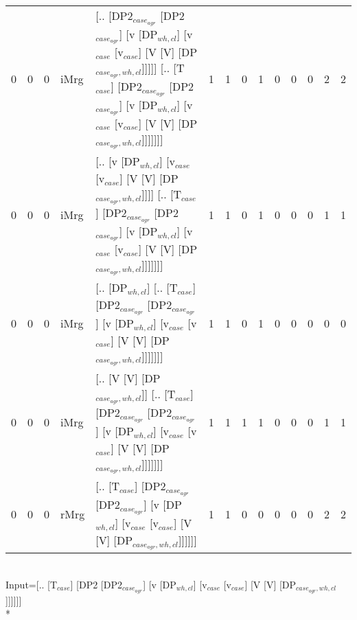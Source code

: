 \begin{tabularx}{\linewidth}{rrrlXrrrrrrrrr}
   0 &       0 &   0 & iMrg & [.. [DP2$_{case_{agr}}$ [DP2$_{case_{agr}}$] [v [DP$_{wh,cl}$] [v$_{case}$ [v$_{case}$] [V [V] [DP$_{case_{agr},wh,cl}$]]]]] [.. [T$_{case}$] [DP2$_{case_{agr}}$ [DP2$_{case_{agr}}$] [v [DP$_{wh,cl}$] [v$_{case}$ [v$_{case}$] [V [V] [DP$_{case_{agr},wh,cl}$]]]]]]] &             1 &             1 &                  0 &            1 &              0 &            0 &              0 &        2 &        2 \\
   0 &       0 &   0 & iMrg & [.. [v [DP$_{wh,cl}$] [v$_{case}$ [v$_{case}$] [V [V] [DP$_{case_{agr},wh,cl}$]]]] [.. [T$_{case}$] [DP2$_{case_{agr}}$ [DP2$_{case_{agr}}$] [v [DP$_{wh,cl}$] [v$_{case}$ [v$_{case}$] [V [V] [DP$_{case_{agr},wh,cl}$]]]]]]]                               &             1 &             1 &                  0 &            1 &              0 &            0 &              0 &        1 &        1 \\
   0 &       0 &   0 & iMrg & [.. [DP$_{wh,cl}$] [.. [T$_{case}$] [DP2$_{case_{agr}}$ [DP2$_{case_{agr}}$] [v [DP$_{wh,cl}$] [v$_{case}$ [v$_{case}$] [V [V] [DP$_{case_{agr},wh,cl}$]]]]]]]                                                                                 &             1 &             1 &                  0 &            1 &              0 &            0 &              0 &        0 &        0 \\
   0 &       0 &   0 & iMrg & [.. [V [V] [DP$_{case_{agr},wh,cl}$]] [.. [T$_{case}$] [DP2$_{case_{agr}}$ [DP2$_{case_{agr}}$] [v [DP$_{wh,cl}$] [v$_{case}$ [v$_{case}$] [V [V] [DP$_{case_{agr},wh,cl}$]]]]]]]                                                                &             1 &             1 &                  1 &            1 &              0 &            0 &              0 &        1 &        1 \\
   0 &       0 &   0 & rMrg & [.. [T$_{case}$] [DP2$_{case_{agr}}$ [DP2$_{case_{agr}}$] [v [DP$_{wh,cl}$] [v$_{case}$ [v$_{case}$] [V [V] [DP$_{case_{agr},wh,cl}$]]]]]]                                                                                                 &             1 &             1 &                  0 &            0 &              0 &            0 &              0 &        2 &        2 \\
\hline
\end{tabularx}\endgroup\\
\begingroup\scriptsize Input=[.. [T$_{case}$] [DP2 [DP2$_{case_{agr}}$] [v [DP$_{wh,cl}$] [v$_{case}$ [v$_{case}$] [V [V] [DP$_{case_{agr},wh,cl}$]]]]]]\\*
